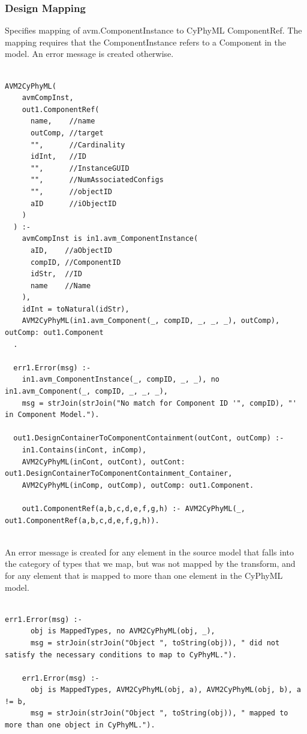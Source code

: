 \subsubsection{Design Mapping}


Specifies mapping of avm.ComponentInstance to CyPhyML ComponentRef. The mapping requires that the ComponentInstance refers to a Component in the model. An error message is created otherwise.
\begin{lstlisting}

AVM2CyPhyML(
    avmCompInst,
    out1.ComponentRef(
      name,    //name
      outComp, //target
      "",      //Cardinality
      idInt,   //ID
      "",      //InstanceGUID
      "",      //NumAssociatedConfigs
      "",      //objectID
      aID      //iObjectID
    )
  ) :-
    avmCompInst is in1.avm_ComponentInstance(
      aID,    //aObjectID
      compID, //ComponentID
      idStr,  //ID
      name    //Name
    ),
    idInt = toNatural(idStr),
    AVM2CyPhyML(in1.avm_Component(_, compID, _, _, _), outComp), outComp: out1.Component
  .

  err1.Error(msg) :-
    in1.avm_ComponentInstance(_, compID, _, _), no in1.avm_Component(_, compID, _, _, _),
    msg = strJoin(strJoin("No match for Component ID '", compID), "' in Component Model.").

  out1.DesignContainerToComponentContainment(outCont, outComp) :-
    in1.Contains(inCont, inComp),
    AVM2CyPhyML(inCont, outCont), outCont: out1.DesignContainerToComponentContainment_Container,
    AVM2CyPhyML(inComp, outComp), outComp: out1.Component.

    out1.ComponentRef(a,b,c,d,e,f,g,h) :- AVM2CyPhyML(_, out1.ComponentRef(a,b,c,d,e,f,g,h)).


\end{lstlisting}

An error message is created for any element in the source model that falls into the category of types that we map, but was not mapped by the transform, and for any element that is mapped to more than one element in the CyPhyML model.
\begin{lstlisting}

err1.Error(msg) :-
      obj is MappedTypes, no AVM2CyPhyML(obj, _),
      msg = strJoin(strJoin("Object ", toString(obj)), " did not satisfy the necessary conditions to map to CyPhyML.").

    err1.Error(msg) :-
      obj is MappedTypes, AVM2CyPhyML(obj, a), AVM2CyPhyML(obj, b), a != b,
      msg = strJoin(strJoin("Object ", toString(obj)), " mapped to more than one object in CyPhyML.").

\end{lstlisting}
